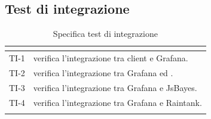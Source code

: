 \renewcommand{\arraystretch}{1}
\newpage

\subsection{Test di integrazione}
\normalsize
\renewcommand{\arraystretch}{1}
\begin{longtable}{|C{2.5cm}|C{13cm}|}
	\hline
	\textbf{\color{title_text}{Test}} & \textbf{\color{title_text}{Specifica}}  \\
	\hline
	\endhead
	{TI-1} & verifica l'integrazione tra client e Grafana. \\
	\hline
	{TI-2} & verifica l'integrazione tra Grafana ed . \\
	\hline
	{TI-3} & verifica l'integrazione tra Grafana e JsBayes.\\
	\hline
	{TI-4} & verifica l'integrazione tra Grafana e Raintank. \\
	\hline
	\caption{Specifica test di integrazione}
	\label{tabella:specifica ti}
\end{longtable}
\renewcommand{\arraystretch}{1}
\newpage


